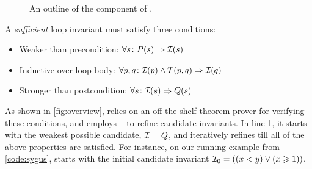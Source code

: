 \documentclass[conference]{IEEEtran}
\begin{document}
\begin{figure}[!t]
    \caption{An outline of the \Infer component of \LoopInvGen.}
    \label{algo:infer}
\end{figure}


A \emph{sufficient} loop invariant \Inv must satisfy three conditions:
\begin{itemize}[leftmargin=1.25em]
    \item Weaker than precondition: \hspace*{4.5pt} $\forall s\colon P(s) \Rightarrow \mathcal{I}(s)$
    \item Inductive over loop body: \hspace*{7.75pt} $\forall p,q\colon \mathcal{I}(p) \wedge T(p,q) \Rightarrow \mathcal{I}(q)$
    \item Stronger than postcondition: $\forall s\colon \mathcal{I}(s) \Rightarrow Q(s)$
\end{itemize}
As shown in \cref{fig:overview}, \Infer relies on an off-the-shelf theorem prover \Checker for verifying these conditions,
and employs \PIE~\cite{Padhi2016DatadrivenPI} to refine candidate invariants.
In line 1, it starts with the weakest possible candidate,
$\mathcal{I} = Q$, and iteratively refines \Inv till all of the above properties are satisfied.
For instance, on our running example from \cref{code:sygus},
\Infer starts with the initial candidate invariant $\mathcal{I}_0 = ((x < y) \vee (x \geqslant 1))$.
\end{document}
